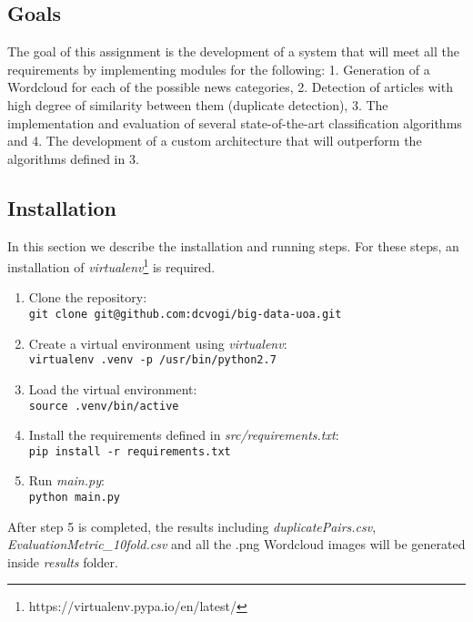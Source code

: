 \subsection{Goals}
The goal of this assignment is the development of a system that will meet all the requirements by implementing modules for the following: 1. Generation of a Wordcloud for each of the possible news categories, 2. Detection of articles with high degree of similarity between them (duplicate detection), 3. The implementation and evaluation of several state-of-the-art classification algorithms and 4. The development of a custom architecture that will outperform the algorithms defined in 3.
\subsection{Installation}
In this section we describe the installation and running steps. For these steps, an installation of \emph{virtualenv}\footnote{https://virtualenv.pypa.io/en/latest/} is required.
\begin{enumerate}
	\item Clone the repository:\\
	\texttt{git clone git@github.com:dcvogi/big-data-uoa.git}
	\item Create a virtual environment using \emph{virtualenv}:\\
	\texttt{virtualenv .venv -p /usr/bin/python2.7}
	\item Load the virtual environment:\\ 
	\texttt{source .venv/bin/active}
	\item Install the requirements defined in \emph{src/requirements.txt}:\\
	\texttt{pip install -r requirements.txt}
	\item Run \emph{main.py}:\\
	\texttt{python main.py}
\end{enumerate}
After step 5 is completed, the results including \emph{duplicatePairs.csv}, \emph{EvaluationMetric\_10fold.csv} and all the .png Wordcloud images will be generated inside \emph{results} folder.